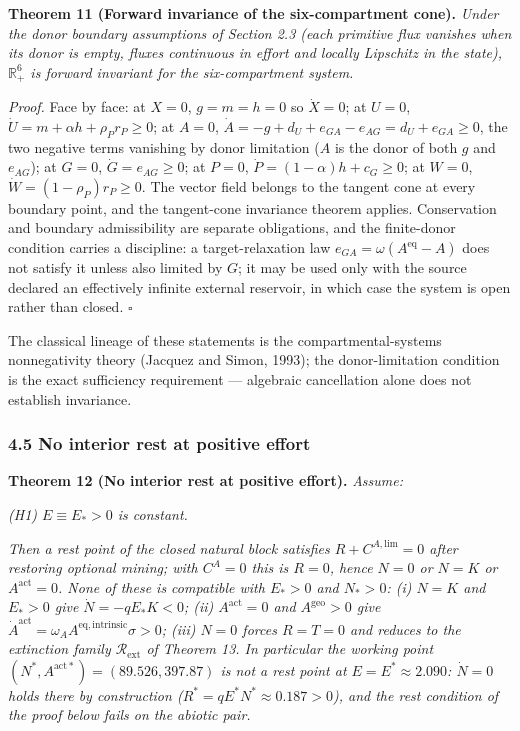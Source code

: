 \documentclass[11pt]{article}
\begin{document}
\textbf{Theorem 11 (Forward invariance of the six-compartment cone).}
\emph{Under the donor boundary assumptions of Section 2.3 (each
primitive flux vanishes when its donor is empty, fluxes continuous in
effort and locally Lipschitz in the state), \(\mathbb{R}^6_+\) is
forward invariant for the six-compartment system.}

\emph{Proof.} Face by face: at \(X = 0\), \(g = m = h = 0\) so
\(\dot X = 0\); at \(U = 0\),
\(\dot U = m + \alpha h + \rho_P r_P \ge 0\); at \(A = 0\),
\(\dot A = -g + d_U + e_{GA} - e_{AG} = d_U + e_{GA} \ge 0\), the two
negative terms vanishing by donor limitation (\(A\) is the donor of both
\(g\) and \(e_{AG}\)); at \(G = 0\), \(\dot G = e_{AG} \ge 0\); at
\(P = 0\), \(\dot P = (1-\alpha)h + c_G \ge 0\); at \(W = 0\),
\(\dot W = (1-\rho_P)r_P \ge 0\). The vector field belongs to the
tangent cone at every boundary point, and the tangent-cone invariance
theorem applies. Conservation and boundary admissibility are separate
obligations, and the finite-donor condition carries a discipline: a
target-relaxation law \(e_{GA} = \omega(A^{\mathrm{eq}} - A)\) does not
satisfy it unless also limited by \(G\); it may be used only with the
source declared an effectively infinite external reservoir, in which
case the system is open rather than closed. \ensuremath{\square}

The classical lineage of these statements is the compartmental-systems
nonnegativity theory (Jacquez and Simon, 1993); the donor-limitation
condition is the exact sufficiency requirement --- algebraic
cancellation alone does not establish invariance.

\subsubsection{4.5 No interior rest at positive
effort}\label{no-interior-rest-at-positive-effort}

\textbf{Theorem 12 (No interior rest at positive effort).}
\emph{Assume:}

\emph{(H1) \(E \equiv E_* > 0\) is constant.}

\emph{Then a rest point of the closed natural block satisfies
\(R + C^{A,\mathrm{lim}} = 0\) after restoring optional mining; with
\(C^A = 0\) this is \(R = 0\), hence \(N = 0\) or \(N = K\) or
\(A^{\mathrm{act}} = 0\). None of these is compatible with \(E_* > 0\)
and \(N_* > 0\): (i) \(N = K\) and \(E_* > 0\) give
\(\dot N = -qE_* K < 0\); (ii) \(A^{\mathrm{act}} = 0\) and
\(A^{\mathrm{geo}} > 0\) give
\(\dot A^{\mathrm{act}} = \omega_A A^{\mathrm{eq,intrinsic}} \sigma > 0\);
(iii) \(N = 0\) forces \(R = T = 0\) and reduces to the extinction
family \(\mathcal{R}_{\mathrm{ext}}\) of Theorem 13. In particular the
working point \((N^*, A^{\mathrm{act}*}) = (89.526, 397.87)\) is not a
rest point at \(E = E^* \approx 2.090\): \(\dot N = 0\) holds there by
construction (\(R^* = qE^*N^* \approx 0.187 > 0\)), and the rest
condition of the proof below fails on the abiotic pair.}
\end{document}
